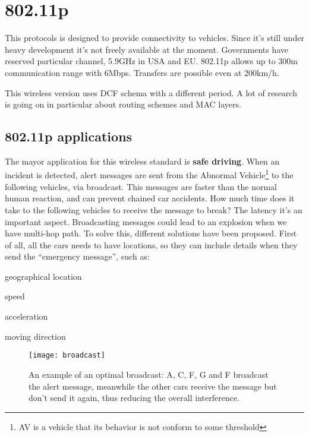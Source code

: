 \section{802.11p}

This protocols is designed to provide connectivity to vehicles. Since it's
still under heavy development it's not freely available at the moment.
Governments have reserved particular channel, 5.9GHz in USA and EU. 802.11p
allows up to 300m communication range with 6Mbps. Transfers are possible
even at 200km/h.

This wireless version uses DCF schema with a different period. A lot of
research is going on in particular about routing schemes and MAC layers.

\subsection{802.11p applications}

The mayor application for this wireless standard is \textbf{safe driving}.
When an incident is detected, alert messages are sent from the Abnormal
Vehicle\footnote{AV is a vehicle that its behavior is not conform to some
threshold} to the following vehicles, via
broadcast. This messages are faster than the normal human reaction, and can
prevent chained car accidents. How much time does it take to the following
vehicles to receive the message to break? The latency it's an important aspect.
Broadcasting messages could lead to an explosion when we have multi-hop path.
To solve this, different solutions have been proposed.
First of all, all the cars needs to have locations, so they can include details
when they send the ``emergency message'', such as:
\begin{AutoMultiColItemize}
\item geographical location
\item speed
\item acceleration
\item moving direction
\end{AutoMultiColItemize}

\begin{figure}[t]
  \centering
  \texttt{[image: broadcast]}
  \caption[Optimal broadcast example]{
    An example of an optimal broadcast: A, C, F, G and F broadcast the alert
    message, meanwhile the other cars receive the message but don't send it
    again, thus reducing the overall interference.
  }
  \label{fig:802.11ws:broadcast}
\end{figure}

